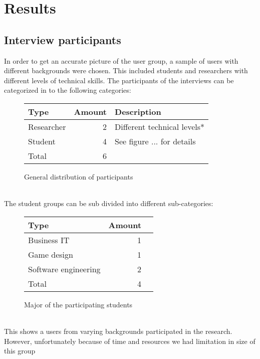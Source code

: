 \documentclass[conference]{IEEEtran}
\begin{document}
\section{Results}
	\subsection{Interview participants}
		In order to get an accurate picture of the user group, a sample of users with different backgrounds were chosen. This included students and researchers with different levels of technical skills. The participants of the interviews can be categorized in to the following categories:
		\begin{figure}[ht]
			\centering
			\begin{tabular}{ | l | r | l | }
				\hline
				Type			& Amount	& Description \\ \hline \hline
				Researcher		& 2			& Different technical levels* \\ \hline
				Student			& 4			& See figure ... for details \\ \hline \hline
				Total			& 6			& \\ \hline
			\end{tabular}
			\caption{General distribution of participants}
		\end{figure}\\
		The student groups can be sub divided into different sub-categories:
		\begin{figure}[ht]
			\centering
			\begin{tabular}{ | l | r | l | }
				\hline
				Type					& Amount \\ \hline \hline
				Business IT				& 1 \\ \hline
				Game design				& 1 \\ \hline
				Software engineering	& 2 \\ \hline
				Total					& 4 \\ \hline
			\end{tabular}
			\caption{Major of the participating students}
		\end{figure} \\
		This shows a users from varying backgrounds participated in the research. However, unfortunately because of time and resources we had limitation in size of this group
\end{document}

